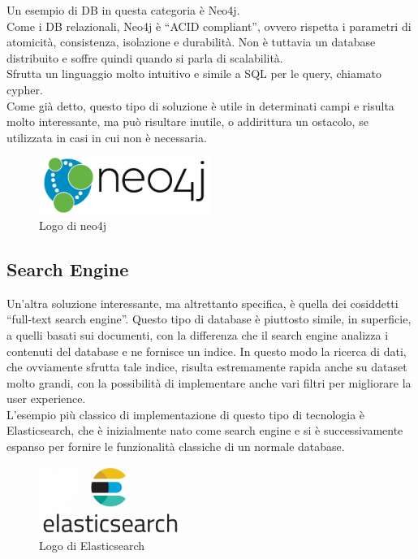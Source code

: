 \noindent Un esempio di DB in questa categoria è Neo4j.\\
Come i DB relazionali, Neo4j è ``ACID compliant'', ovvero rispetta i parametri di atomicità, consistenza, isolazione e durabilità. Non è tuttavia un database distribuito e soffre quindi quando si parla di scalabilità.\\
Sfrutta un linguaggio molto intuitivo e simile a SQL per le query, chiamato cypher.\\

\noindent Come già detto, questo tipo di soluzione è utile in determinati campi e risulta molto interessante, ma può risultare inutile, o addirittura un ostacolo, se utilizzata in casi in cui non è necessaria.

\begin{figure}[htbp]
\begin{center}
\includegraphics[height=5em]{immagini/tecnologies-logos/neo4j-logo.png}
\caption{Logo di neo4j}
\end{center}
\end{figure}

\subsection{Search Engine}
Un'altra soluzione interessante, ma altrettanto specifica, è quella dei cosiddetti ``full-text search engine''. Questo tipo di database è piuttosto simile, in superficie, a quelli basati sui documenti, con la differenza che il search engine analizza i contenuti del database e ne fornisce un indice. In questo modo la ricerca di dati, che ovviamente sfrutta tale indice, risulta estremamente rapida anche su dataset molto grandi, con la possibilità di implementare anche vari filtri per migliorare la user experience.\\

\noindent L'esempio più classico di implementazione di questo tipo di tecnologia è Elasticsearch, che è inizialmente nato come search engine e si è successivamente espanso per fornire le funzionalità classiche di un normale database.

\begin{figure}[htbp]
\begin{center}
\includegraphics[height=6em]{immagini/tecnologies-logos/Elasticsearch-Logo.png}
\caption{Logo di Elasticsearch}
\end{center}
\end{figure}

